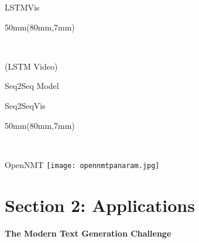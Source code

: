\documentclass[draft]{beamer}
\def\research#1{\begin{textblock*}{50mm}(80mm,7mm)\centerline{\textcolor{white}{ \footnotesize #1}}\end{textblock*}}
\let\realcitet\citet
\renewcommand*{\citet}[1]{{\scriptsize \realcitet{#1}}}
\begin{document}
\begin{frame}{LSTMVis}
  \research{\citet{Strobelt2016} w/ IBM}

  (LSTM Video)


\end{frame}

\begin{frame}{Seq2Seq Model}
\end{frame}

\begin{frame}{Seq2SeqVis}
  \research{\citet{strobelt2019s} w/ IBM}

  
\end{frame}


\begin{frame}{OpenNMT}
  \texttt{[image: opennmtpanaram.jpg]}
\end{frame}


\section{Section 2: Applications}
\begin{frame}
  \begin{center}
    \textbf{The Modern Text Generation Challenge} 
  \end{center}
  \begin{center}
  \end{center}
\end{frame}

\end{document}
